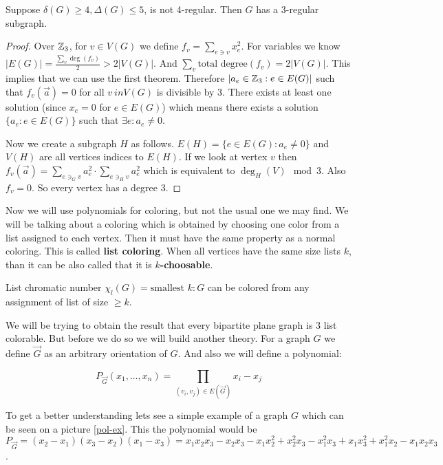 \begin{thm}
	Suppose $\delta(G) \geq 4, \Delta(G) \leq 5$, is not 4-regular. Then $G$ has a $3$-regular subgraph.
\end{thm}

\begin{proof}
	Over $\mathbb{Z}_{3}$, for $v \in V(G)$ we define $f_{v} = \sum_{e \ni v} x_{e}^{2}$. For variables we know $|E(G)| = \frac{\sum_{v} \deg(f_{v})}{2} > 2|V(G)|$. And $\sum_{v} \text{total degree}(f_v) = 2|V(G)|$. This implies that we can use the first theorem. Therefore $|a_{e} \in \mathbb{Z}_{3} : e \in E(G)|$ such that $f_{v}(\overrightarrow{a}) =0$ for all $v \ in V(G)$ is divisible by 3. There exists at least one solution (since $x_{e} = 0$ for $e \in E(G)$) which means there exists a solution $\{a_{e} : e \in E(G)\}$ such that $\exists e : a_{e} \neq 0$.
	
	Now we create a subgraph $H$ as follows. $E(H) = \{e \in E(G) : a_{e} \neq 0\}$ and $V(H)$ are all vertices indices to $E(H)$. If we look at vertex $v$ then $f_{v}(\overrightarrow{a}) = \sum_{e \ni_{G} v} a_{e}^{2} \cdot \sum_{e \ni_{H} v} a_{e}^{2}$ which is equivalent to $\deg_{H}(V) \mod 3$. Also $f_{v} = 0$. So every vertex has a degree 3.
\end{proof}

Now we will use polynomials for coloring, but not the usual one we may find. We will be talking about a coloring which is obtained by choosing one color from a list assigned to each vertex. Then it must have the same property as a normal coloring. This is called \textbf{list coloring}. When all vertices have the same size lists $k$, than it can be also called that it is \textbf{$k$-choosable}.

\begin{defn}
	List chromatic number $\chi_{l}(G) = \text{smallest } k : G$ can be colored from any assignment of list of size $\geq k$.
\end{defn}

We will be trying to obtain the result that every bipartite plane graph is $3$ list colorable. But before we do so we will build another theory. For a graph $G$ we define $\overrightarrow{G}$ as an arbitrary orientation of $G$. And also we will define a polynomial:

$$
P_{\overrightarrow{G}} (x_{1}, \dots, x_{n}) = \prod_{(v_{i},v_{j}) \in E(\overrightarrow{G})} x_{i} - x_{j}
$$

To get a better understanding lets see a simple example of a graph $G$ which can be seen on a picture \ref{pol-ex}. This the polynomial would be $P_{\overrightarrow{G}} = (x_{2} - x_{1}) (x_{3} - x_{2}) (x_{1} - x_{3}) = x_1 x_2 x_3 - x_2 x_3 - x_1 x_2^2 + x_2^2 x_3 - x_1^2 x_3 + x_1 x_3^2 + x_1^2 x_2 - x_1x_2x_3$.

